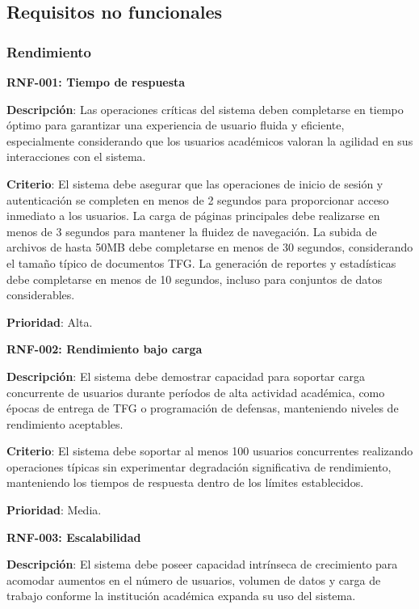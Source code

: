 \documentclass[12pt,a4paper,oneside]{report}
\begin{document}
\subsection{Requisitos no funcionales}\label{requisitos-no-funcionales}

\subsubsection{Rendimiento}\label{rendimiento}

\textbf{RNF-001: Tiempo de respuesta}

\textbf{Descripción}: Las operaciones críticas del sistema deben completarse en tiempo óptimo para garantizar una experiencia de usuario fluida y eficiente, especialmente considerando que los usuarios académicos valoran la agilidad en sus interacciones con el sistema.

\textbf{Criterio}: El sistema debe asegurar que las operaciones de inicio de sesión y autenticación se completen en menos de 2 segundos para proporcionar acceso inmediato a los usuarios. La carga de páginas principales debe realizarse en menos de 3 segundos para mantener la fluidez de navegación. La subida de archivos de hasta 50MB debe completarse en menos de 30 segundos, considerando el tamaño típico de documentos TFG. La generación de reportes y estadísticas debe completarse en menos de 10 segundos, incluso para conjuntos de datos considerables.

\textbf{Prioridad}: Alta.

\textbf{RNF-002: Rendimiento bajo carga}

\textbf{Descripción}: El sistema debe demostrar capacidad para soportar carga concurrente de usuarios durante períodos de alta actividad académica, como épocas de entrega de TFG o programación de defensas, manteniendo niveles de rendimiento aceptables.

\textbf{Criterio}: El sistema debe soportar al menos 100 usuarios concurrentes realizando operaciones típicas sin experimentar degradación significativa de rendimiento, manteniendo los tiempos de respuesta dentro de los límites establecidos.

\textbf{Prioridad}: Media.

\textbf{RNF-003: Escalabilidad}

\textbf{Descripción}: El sistema debe poseer capacidad intrínseca de crecimiento para acomodar aumentos en el número de usuarios, volumen de datos y carga de trabajo conforme la institución académica expanda su uso del sistema.
\end{document}
